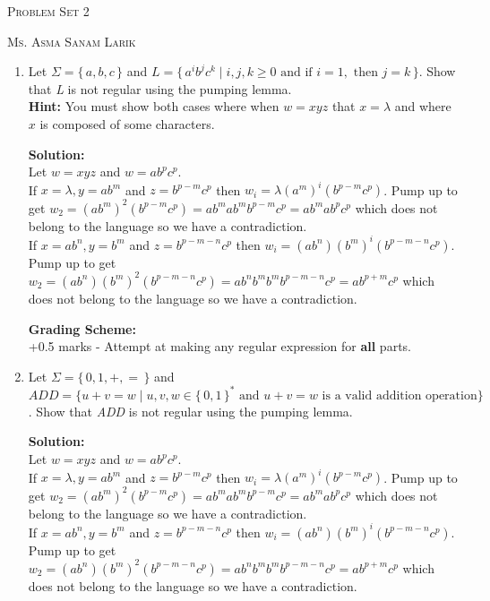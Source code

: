 \documentclass[11pt, article, oneside]{memoir}
\newcommand{\set}[1]{\{\, #1\, \}}
\begin{document}
\begin{center}
\LARGE{\textsc{Problem Set 2}}
 
\large{\textsc{Ms. Asma Sanam Larik}}
\end{center}

\begin{enumerate}
    \item
        Let \(\Sigma = \set{a, b, c}\) and \(L = \set{ {a^i}{b^j}{c^k} \mid i, j, k \ge 0 \text{ and if } i = 1,  \text{ then } j = k}\). Show that \textit{L} is not regular using the pumping lemma.
        \\\textbf{Hint:} You must show both cases where when \(w = xyz\) that \(x = \lambda\) and where \(x\) is composed of some characters.

        \textbf{Solution:}
        \\Let \(w = xyz\) and \(w = ab^pc^p\).
        \\If \(x = \lambda, y = ab^m\) and \(z = b^{p - m}c^p\) then \(w_i = \lambda(a^m)^i(b^{p - m}c^p)\). Pump up to get \(w_2 = (ab^m)^2(b^{p - m}c^p) = ab^mab^mb^{p - m}c^p = ab^mab^pc^p\) which does not belong to the language so we have a contradiction.
        \\If \(x = ab^n, y = b^m\) and \(z = b^{p - m - n}c^p\) then \(w_i = (ab^n)(b^m)^i(b^{p - m - n}c^p)\). Pump up to get \(w_2 = (ab^n)(b^m)^2(b^{p - m - n}c^p) = ab^nb^mb^mb^{p - m - n}c^p = ab^{p + m}c^p\) which does not belong to the language so we have a contradiction.

        \textbf{Grading Scheme:}
        \\+0.5 marks - Attempt at making any regular expression for \textbf{all} parts.
        
    \item 
        Let \(\Sigma = \set{0, 1, +, =}\) and \(ADD = \{ u+v=w \mid u, v, w \in \set{0, 1}^* \text{ and } u+v=w \text{ is a valid addition operation}\}\). Show that \textit{ADD} is not regular using the pumping lemma.
        
        \textbf{Solution:}
        \\Let \(w = xyz\) and \(w = ab^pc^p\).
        \\If \(x = \lambda, y = ab^m\) and \(z = b^{p - m}c^p\) then \(w_i = \lambda(a^m)^i(b^{p - m}c^p)\). Pump up to get \(w_2 = (ab^m)^2(b^{p - m}c^p) = ab^mab^mb^{p - m}c^p = ab^mab^pc^p\) which does not belong to the language so we have a contradiction.
        \\If \(x = ab^n, y = b^m\) and \(z = b^{p - m - n}c^p\) then \(w_i = (ab^n)(b^m)^i(b^{p - m - n}c^p)\). Pump up to get \(w_2 = (ab^n)(b^m)^2(b^{p - m - n}c^p) = ab^nb^mb^mb^{p - m - n}c^p = ab^{p + m}c^p\) which does not belong to the language so we have a contradiction.


\end{enumerate}
\end{document}
